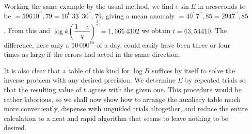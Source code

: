 \noindent Working the same example by the usual method, we find $e\sin E$ in arcseconds to be $=59610^{\prime\prime}{,}79=16^0\,33^{\prime}\,30^{\prime\prime}{,}79$, giving a mean anomaly $=49^{\prime}\,7^{\prime\prime}{,}85=2947^{\prime\prime}{,}85$. From this and $\log k\left(\dfrac{1-e}{q}\right)^{\frac{3}{2}}=1{,}666\,4302$ we obtain $t=63{,}54410$. The difference, here only a $10\,000^{\mathrm{th}}$ of a day, could easily have been three or four times as large if the errors had acted in the same direction.

It is also clear that a table of this kind for $\log B$ suffices by itself to solve the inverse problem with any desired precision. We determine $E$ by repeated trials so that the resulting value of $t$ agrees with the given one. This procedure would be rather laborious, so we shall now show how to arrange the auxiliary table much more conveniently, dispense with unguided trials altogether, and reduce the entire calculation to a neat and rapid algorithm that seems to leave nothing to be desired.
